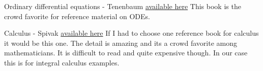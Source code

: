 \documentclass[12pt]{article}
\begin{document}
		Ordinary differential equations - Tenenbaum
		\href{https://www.amazon.com/dp/0486649407/?coliid=IWR57NBWZ0IMZ&colid=GS5E8RW84L1Y}{available here}
		This book is the crowd favorite for reference material on ODEs.

		Calculus - Spivak
		\href{https://www.amazon.com/Calculus-4th-Michael-Spivak/dp/0914098918?sr=8-1}{available here}
		If I had to choose one reference book for calculus it would be this one.
		The detail is amazing and its a crowd favorite among mathematicians.
		It is difficult to read and quite expensive though.
		In our case this is for integral calculus examples.


	\nocite{*}

	\newpage %
	\backmatter
	\printbibliography

	\newpage %
	\printindex

	\newpage %
	\appendix
\end{document}
